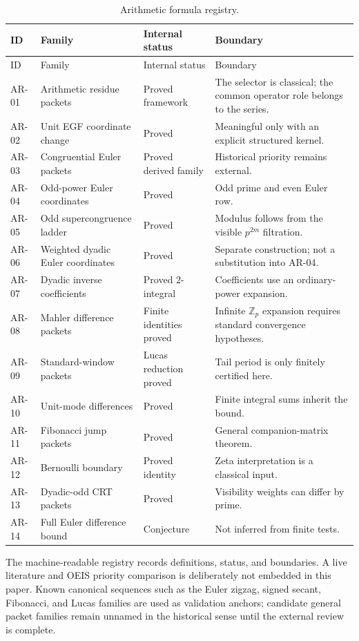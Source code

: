 \documentclass[11pt]{article}
\theoremstyle{definition}
\theoremstyle{remark}
\newcommand{\bbZ}{\mathbb Z}
\begin{document}
\begin{longtable}{L{0.09\textwidth}L{0.29\textwidth}L{0.22\textwidth}L{0.29\textwidth}}
\caption{Arithmetic formula registry.}\label{tab:registry}\\
\toprule
ID & Family & Internal status & Boundary\\
\midrule
\endfirsthead
\toprule
ID & Family & Internal status & Boundary\\
\midrule
\endhead
AR-01 & Arithmetic residue packets & Proved framework & The selector is classical; the common operator role belongs to the series.\\
AR-02 & Unit EGF coordinate change & Proved & Meaningful only with an explicit structured kernel.\\
AR-03 & Congruential Euler packets & Proved derived family & Historical priority remains external.\\
AR-04 & Odd-power Euler coordinates & Proved & Odd prime and even Euler row.\\
AR-05 & Odd supercongruence ladder & Proved & Modulus follows from the visible $p^{2m}$ filtration.\\
AR-06 & Weighted dyadic Euler coordinates & Proved & Separate construction; not a substitution into AR-04.\\
AR-07 & Dyadic inverse coefficients & Proved $2$-integral & Coefficients use an ordinary-power expansion.\\
AR-08 & Mahler difference packets & Finite identities proved & Infinite $\bbZ_p$ expansion requires standard convergence hypotheses.\\
AR-09 & Standard-window packets & Lucas reduction proved & Tail period is only finitely certified here.\\
AR-10 & Unit-mode differences & Proved & Finite integral sums inherit the bound.\\
AR-11 & Fibonacci jump packets & Proved & General companion-matrix theorem.\\
AR-12 & Bernoulli boundary & Proved identity & Zeta interpretation is a classical input.\\
AR-13 & Dyadic-odd CRT packets & Proved & Visibility weights can differ by prime.\\
AR-14 & Full Euler difference bound & Conjecture & Not inferred from finite tests.\\
\bottomrule
\end{longtable}

The machine-readable registry records definitions, status, and boundaries. A live literature and OEIS priority comparison is deliberately not embedded in this paper. Known canonical sequences such as the Euler zigzag, signed secant, Fibonacci, and Lucas families are used as validation anchors; candidate general packet families remain unnamed in the historical sense until the external review is complete.
\end{document}
